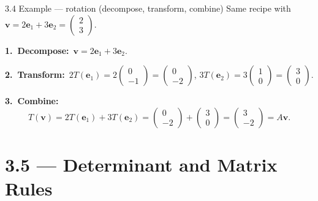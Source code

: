 \documentclass[11pt,aspectratio=169]{beamer}
\begin{document}
\begin{frame}{3.4 Example --- rotation (decompose, transform, combine)}
  \footnotesize
  Same recipe with $\mathbf{v}=2\mathbf{e}_1+3\mathbf{e}_2=\begin{pmatrix}2\\ 3\end{pmatrix}$.

  \medskip
  \textbf{1.\ Decompose:}\
  $\mathbf{v}=2\mathbf{e}_1+3\mathbf{e}_2$.

  \medskip
  \textbf{2.\ Transform:}\
  $2T(\mathbf{e}_1)=2\begin{pmatrix}0\\ -1\end{pmatrix}=\begin{pmatrix}0\\ -2\end{pmatrix}$,
  \quad
  $3T(\mathbf{e}_2)=3\begin{pmatrix}1\\ 0\end{pmatrix}=\begin{pmatrix}3\\ 0\end{pmatrix}$.

  \medskip
  \textbf{3.\ Combine:}\
  \[
    T(\mathbf{v})
    =2T(\mathbf{e}_1)+3T(\mathbf{e}_2)
    =\begin{pmatrix}0\\ -2\end{pmatrix}+\begin{pmatrix}3\\ 0\end{pmatrix}
    =\begin{pmatrix}3\\ -2\end{pmatrix}
    =A\mathbf{v}.
  \]
\end{frame}

\section{3.5 --- Determinant and Matrix Rules}
\end{document}
